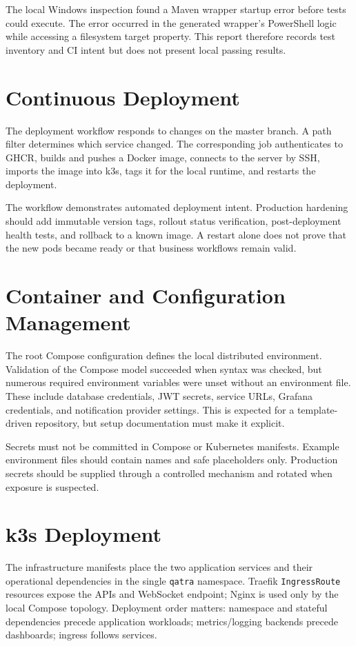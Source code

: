 The local Windows inspection found a Maven wrapper startup error before tests could execute. The error occurred in the generated wrapper's PowerShell logic while accessing a filesystem target property. This report therefore records test inventory and CI intent but does not present local passing results.

\section{Continuous Deployment}
The deployment workflow responds to changes on the master branch. A path filter determines which service changed. The corresponding job authenticates to GHCR, builds and pushes a Docker image, connects to the server by SSH, imports the image into k3s, tags it for the local runtime, and restarts the deployment.


The workflow demonstrates automated deployment intent. Production hardening should add immutable version tags, rollout status verification, post-deployment health tests, and rollback to a known image. A restart alone does not prove that the new pods became ready or that business workflows remain valid.

\section{Container and Configuration Management}
The root Compose configuration defines the local distributed environment. Validation of the Compose model succeeded when syntax was checked, but numerous required environment variables were unset without an environment file. These include database credentials, JWT secrets, service URLs, Grafana credentials, and notification provider settings. This is expected for a template-driven repository, but setup documentation must make it explicit.

Secrets must not be committed in Compose or Kubernetes manifests. Example environment files should contain names and safe placeholders only. Production secrets should be supplied through a controlled mechanism and rotated when exposure is suspected.

\section{k3s Deployment}
The infrastructure manifests place the two application services and their operational dependencies in the single \texttt{qatra} namespace. Traefik \texttt{IngressRoute} resources expose the APIs and WebSocket endpoint; Nginx is used only by the local Compose topology. Deployment order matters: namespace and stateful dependencies precede application workloads; metrics/logging backends precede dashboards; ingress follows services.

